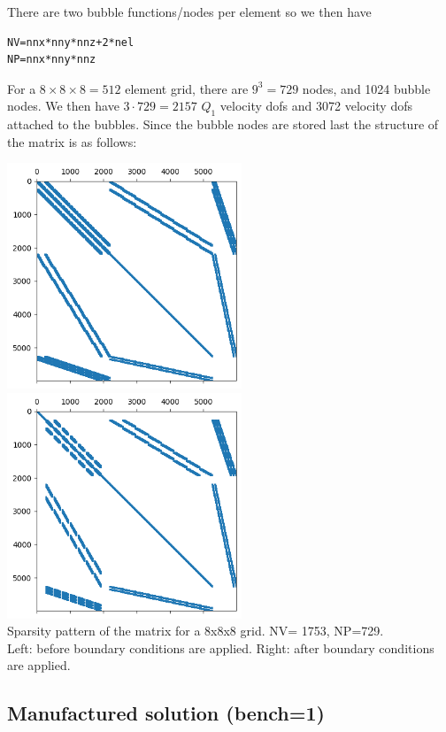There are two bubble functions/nodes per element so we then have 
\begin{lstlisting}
NV=nnx*nny*nnz+2*nel 
NP=nnx*nny*nnz
\end{lstlisting}
For a $8\times 8 \times 8=512$ element grid, there are $9^3=729$ nodes, and 1024 bubble nodes.
We then have $3\cdot 729=2157$ $Q_1$ velocity dofs and 3072 velocity dofs attached 
to the bubbles.
Since the bubble nodes are stored last the structure of the matrix is as follows:
\begin{center}
\includegraphics[width=7cm]{python_codes/fieldstone_82/results/matrix_8x8x8_bef_bc}
\includegraphics[width=7cm]{python_codes/fieldstone_82/results/matrix_8x8x8_aft_bc}\\
{\captionfont Sparsity pattern of the matrix for a 8x8x8 grid.
NV= 1753, NP=729.\\ Left:
before boundary conditions are applied. 
Right: after boundary conditions are applied.} 
\end{center}

\subsection*{Manufactured solution (bench=1)}

